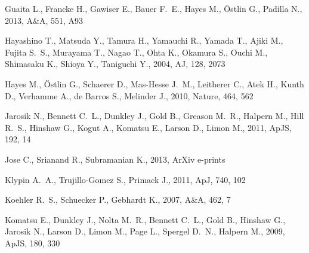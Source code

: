 \documentclass[usenatbib]{mn2e}
\newcommand{\apj}{ApJ}
\newcommand{\apjs}{ApJS}
\newcommand{\aj}{AJ}
\newcommand{\aap}{A\&A}
\newcommand{\nat}{Nature}
\begin{document}
{\begin{thebibliography}{}
{Guaita} L.,  {Francke} H.,  {Gawiser} E.,  {Bauer} F.~E.,  {Hayes} M.,
  {{\"O}stlin} G.,    {Padilla} N.,  2013, \aap, 551, A93

{Hayashino} T.,  {Matsuda} Y.,  {Tamura} H.,  {Yamauchi} R.,  {Yamada} T.,
  {Ajiki} M.,  {Fujita} S.~S.,  {Murayama} T.,  {Nagao} T.,  {Ohta} K.,
  {Okamura} S.,  {Ouchi} M.,  {Shimasaku} K.,  {Shioya} Y.,    {Taniguchi} Y.,
  2004, \aj, 128, 2073

{Hayes} M.,  {{\"O}stlin} G.,  {Schaerer} D.,  {Mas-Hesse} J.~M.,  {Leitherer}
  C.,  {Atek} H.,  {Kunth} D.,  {Verhamme} A.,  {de Barros} S.,    {Melinder}
  J.,  2010, \nat, 464, 562

{Jarosik} N.,  {Bennett} C.~L.,  {Dunkley} J.,  {Gold} B.,  {Greason} M.~R.,
  {Halpern} M.,  {Hill} R.~S.,  {Hinshaw} G.,  {Kogut} A.,  {Komatsu} E.,
  {Larson} D.,    {Limon} M.,  2011, \apjs, 192, 14

{Jose} C.,  {Srianand} R.,    {Subramanian} K.,  2013, ArXiv e-prints

{Klypin} A.~A.,  {Trujillo-Gomez} S.,    {Primack} J.,  2011, \apj, 740, 102

{Koehler} R.~S.,  {Schuecker} P.,    {Gebhardt} K.,  2007, \aap, 462, 7

{Komatsu} E.,  {Dunkley} J.,  {Nolta} M.~R.,  {Bennett} C.~L.,  {Gold} B.,
  {Hinshaw} G.,  {Jarosik} N.,  {Larson} D.,  {Limon} M.,  {Page} L.,
  {Spergel} D.~N.,    {Halpern} M.,  2009, \apjs, 180, 330


\end{thebibliography}}
\end{document}
